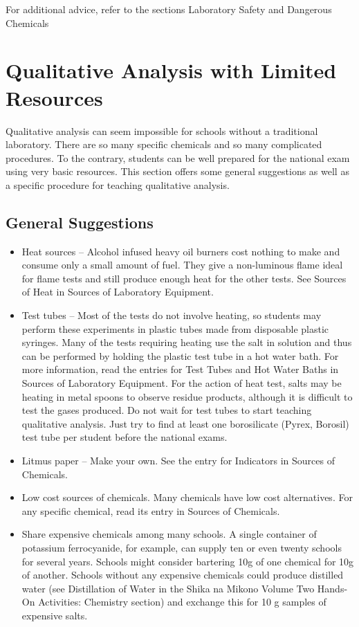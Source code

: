 For additional advice, 
refer to the sections Laboratory Safety and Dangerous Chemicals

\section{Qualitative Analysis with Limited Resources}

Qualitative analysis can seem impossible for schools 
without a traditional laboratory. 
There are so many specific chemicals 
and so many complicated procedures. 
To the contrary, 
students can be well prepared for the national exam 
using very basic resources. 
This section offers some general suggestions as well as 
a specific procedure for teaching qualitative analysis.

\subsection{General Suggestions}
\begin{itemize}
\item{Heat sources – Alcohol infused heavy oil burners 
cost nothing to make and consume only a small amount of fuel. 
They give a non-luminous flame ideal for flame tests 
and still produce enough heat for the other tests. 
See Sources of Heat in Sources of Laboratory Equipment.}
\item{Test tubes – Most of the tests do not involve heating, 
so students may perform these experiments in plastic tubes 
made from disposable plastic syringes. 
Many of the tests requiring heating use the salt in solution 
and thus can be performed 
by holding the plastic test tube in a hot water bath. 
For more information, 
read the entries for Test Tubes 
and Hot Water Baths in Sources of Laboratory Equipment.
For the action of heat test, 
salts may be heating in metal spoons to observe residue products, 
although it is difficult to test the gases produced. 
Do not wait for test tubes to start teaching qualitative analysis. 
Just try to find at least one borosilicate (Pyrex, 
Borosil) test tube per student before the national exams.}
\item{Litmus paper – Make your own. 
See the entry for Indicators in Sources of Chemicals.}
\item{Low cost sources of chemicals. 
Many chemicals have low cost alternatives. 
For any specific chemical, 
read its entry in Sources of Chemicals.}
\item{Share expensive chemicals among many schools. 
A single container of potassium ferrocyanide, 
for example, 
can supply ten or even twenty schools for several years. 
Schools might consider bartering 10g of one chemical for 10g of another. 
Schools without any expensive chemicals could produce distilled water (see Distillation of Water in the Shika na Mikono Volume Two Hands-On Activities: Chemistry section) and exchange this for 10 g samples of expensive salts.}
\end{itemize} 
                                              

